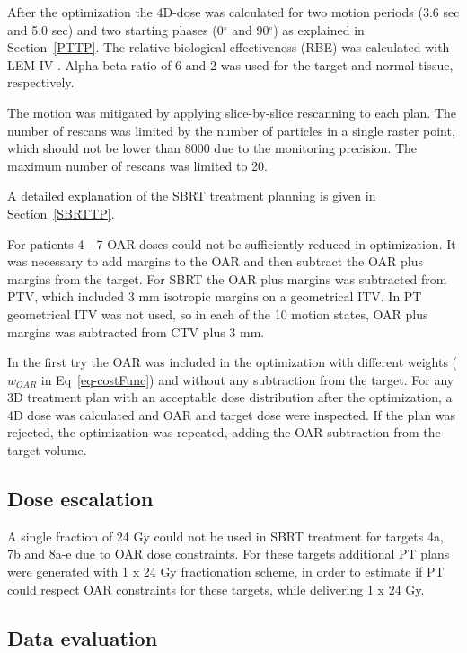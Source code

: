 After the optimization the 4D-dose was calculated for two motion periods (3.6 sec and 5.0 sec) and two starting phases (0$^\circ$ and 90$^\circ$) as explained in Section~\ref{PTTP}. 
The relative biological effectiveness (RBE) was calculated with LEM IV \cite{Elsaesser2010}. 
Alpha beta ratio of 6 and 2 was used for the target and normal tissue, respectively.

The motion was mitigated by applying slice-by-slice rescanning to each plan. 
The number of rescans was limited by the number of particles in a single raster point, which should not be lower than 8000 due to the
monitoring precision. The maximum number of rescans was limited to 20.

A detailed explanation of the SBRT treatment planning is given in Section~\ref{SBRTTP}.

For patients 4 - 7 OAR doses could not be sufficiently reduced in optimization. It was necessary to add margins to the OAR and then 
subtract the OAR plus margins from the target. For SBRT the OAR plus margins was subtracted from PTV, which included 3 mm isotropic margins on a geometrical ITV. 
In PT geometrical ITV was not used, so in each of the 10 motion states, OAR plus margins was subtracted from CTV plus 3 mm. 

In the first try the OAR was included in the optimization with different weights ($w_{OAR}$ in Eq~\ref{eq-costFunc}) and without any subtraction from the target. 
For any 3D treatment plan with an acceptable dose distribution after the optimization, a 4D dose was calculated and OAR and target dose were inspected. If the plan was rejected, the optimization was repeated, adding the OAR subtraction from the target volume. 



\subsection{Dose escalation}

A single fraction of 24 Gy could not be used in SBRT treatment for targets 4a, 7b and 8a-e due to OAR dose constraints. For these targets additional 
PT plans were generated with 1 x 24 Gy fractionation scheme, in order
to estimate if PT could respect OAR constraints for these targets, while delivering 1 x 24 Gy. 

\subsection{Data evaluation}

